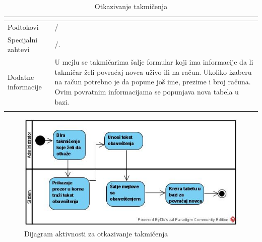 \documentclass[../../main.tex]{subfiles}
\begin{document}
\begin{longtable}{| p{} | p{} |}
\begin{itemize}
    \end{itemize}\\
\hline
    Podtokovi & /\\
\hline
    Specijalni zahtevi & /.\\
\hline
    Dodatne informacije & U mejlu se takmičarima šalje formular koji ima informacije da li takmičar želi povraćaj novca uživo ili na račun. Ukoliko izaberu na račun potrebno je da popune još ime, prezime i broj računa. Ovim povratnim informacijama se popunjava nova tabela u bazi. \\
\hline
\caption{Otkazivanje takmičenja} %
\end{longtable}

\begin{figure}[!ht]
\begin{center}
\includegraphics[scale=0.55]{sections/images/dijagram_aktivnosti_otkazivanje_takmicenja.jpg}
\end{center}
\caption{Dijagram aktivnosti za otkazivanje takmičenja}
\label{fig:kontekst}
\end{figure}
\end{document}
